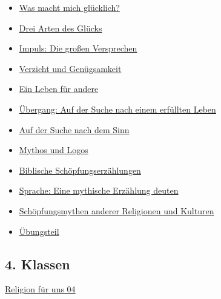 \documentclass[11pt]{article}
\begin{document}
\begin{itemize}
\item \href{/home/matthias/Documents/notes/Mattsee\_Religion\_für\_uns/20251204T225112--was-macht-mich-glücklich\_\_03\_fragen.org}{Was macht mich glücklich?}
\item \href{/home/matthias/Documents/notes/Mattsee\_Religion\_für\_uns/20251204T225132--drei-arten-des-glücks\_\_03\_fragen.org}{Drei Arten des Glücks}
\item \href{/home/matthias/Documents/notes/Mattsee\_Religion\_für\_uns/20251204T225147--impuls-die-großen-versprechen\_\_03\_fragen.org}{Impuls: Die großen Versprechen}
\item \href{/home/matthias/Documents/notes/Mattsee\_Religion\_für\_uns/20251204T225204--verzicht-und-genügsamkeit\_\_03\_fragen.org}{Verzicht und Genügsamkeit}
\item \href{/home/matthias/Documents/notes/Mattsee\_Religion\_für\_uns/20251204T225222--ein-leben-für-andere\_\_03\_fragen.org}{Ein Leben für andere}
\item \href{/home/matthias/Documents/notes/Mattsee\_Religion\_für\_uns/20251204T225243--übergang-auf-der-suche-nach-einem-erfüllten-leben\_\_03\_fragen.org}{Übergang: Auf der Suche nach einem erfüllten Leben}
\item \href{/home/matthias/Documents/notes/Mattsee\_Religion\_für\_uns/20251204T225301--auf-der-suche-nach-dem-sinn\_\_03\_fragen.org}{Auf der Suche nach dem Sinn}
\item \href{/home/matthias/Documents/notes/Mattsee\_Religion\_für\_uns/20251204T225314--mythos-und-logos\_\_03\_fragen.org}{Mythos und Logos}
\item \href{/home/matthias/Documents/notes/Mattsee\_Religion\_für\_uns/20251204T225329--biblische-schöpfungserzählungen\_\_03\_fragen.org}{Biblische Schöpfungserzählungen}
\item \href{/home/matthias/Documents/notes/Mattsee\_Religion\_für\_uns/20251204T225343--sprache-eine-mythische-erzählung-deuten\_\_03\_fragen.org}{Sprache: Eine mythische Erzählung deuten}
\item \href{/home/matthias/Documents/notes/Mattsee\_Religion\_für\_uns/20251204T225359--schöpfungsmythen-anderer-religionen-und-kulturen\_\_03\_fragen.org}{Schöpfungsmythen anderer Religionen und Kulturen}
\item \href{/home/matthias/Documents/notes/Mattsee\_Religion\_für\_uns/20251204T225416--übungsteil\_\_03\_fragen.org}{Übungsteil}
\end{itemize}
\subsection{4. Klassen}
\label{sec:org033f631}

\href{/home/matthias/Documents/notes/20250913T113501--religion-für-uns-04\_\_project\_topic04.org}{Religion für uns 04}
\end{document}
